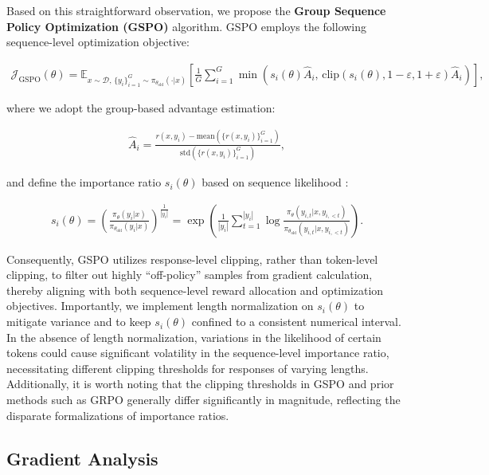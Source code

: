 Based on this straightforward observation, we propose the \textbf{Group Sequence Policy Optimization (GSPO)} algorithm. GSPO employs the following sequence-level optimization objective:

\begin{align}
\mathcal{J}_\text{GSPO} (\theta) =
\mathbb{E}_{ x \sim \mathcal{D},\, \{y_i\}_{i=1}^G \sim \pi_{\theta_\text{old}}( \cdot | x) }
\left[ 
\frac{1}{G} \sum_{i=1}^{G}
\min \left( s_{i}(\theta)  \widehat{A}_{i},  \, \mathrm{clip} \left( s_{i}(\theta), 1 - {\varepsilon}, 1 + {\varepsilon} \right) \widehat{A}_{i} \right) 
\right],
\label{equ:gspo}
\end{align}

where we adopt the group-based advantage estimation:

\begin{align}
\widehat{A}_{i} = \frac{r(x, y_i) - \mathrm{mean} \left( \{ r(x, y_i) \}_{i=1}^G \right) }{ \mathrm{std} \left( \{ r(x, y_i) \}_{i=1}^G \right) },
\end{align}

and define the importance ratio $s_{i}(\theta)$ based on sequence likelihood \citep{click}:

\begin{align}
s_{i}(\theta) = \left( \frac{ \pi_{\theta} (y_i | x) }{ \pi_{\theta_\text{old}} (y_i | x)} \right)^{\frac{1}{|y_i|}}
=
\exp \left( \frac{1}{|y_i|} \sum_{t=1}^{|y_i|} \log \frac{ \pi_{\theta} (y_{i,t} | x, y_{i,<t}) }{ \pi_{\theta_\text{old}} (y_{i,t} | x,y_{i,<t})} \right).
\end{align}

Consequently, GSPO utilizes response-level clipping, rather than token-level clipping, to filter out highly ``off-policy'' samples from gradient calculation, thereby aligning with both sequence-level reward allocation and optimization objectives. Importantly, we implement length normalization on $s_{i}(\theta)$ to mitigate variance and to keep $s_{i}(\theta)$ confined to a consistent numerical interval. In the absence of length normalization, variations in the likelihood of certain tokens could cause significant volatility in the sequence-level importance ratio, necessitating different clipping thresholds for responses of varying lengths. Additionally, it is worth noting that the clipping thresholds in GSPO and prior methods such as GRPO generally differ significantly in magnitude, reflecting the disparate formalizations of importance ratios.

\subsection{Gradient Analysis}
\label{subsec:gradient}

